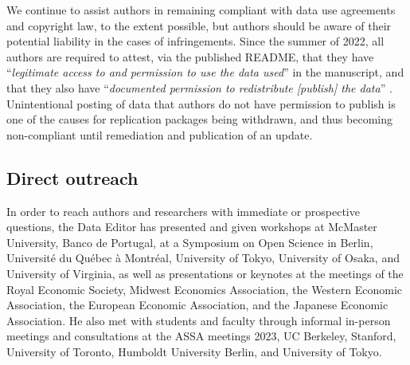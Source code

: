 We continue to assist authors in remaining compliant with data use agreements and copyright law, to the extent possible, but authors should be aware of their potential liability in the cases of infringements. Since the summer of 2022, all authors are required to attest, via the published README, that they have ``\textit{legitimate access to and permission to use the data used}'' in the manuscript, and that they also have ``\textit{documented permission to redistribute [publish] the data}'' \citep[][pg.1]{READMEv1.1.0}. Unintentional posting of data that authors do not have permission to publish is one of the causes for replication packages being withdrawn, and thus becoming non-compliant until remediation and publication of an update.

\subsection{Direct outreach}

In order to reach authors and researchers with immediate or prospective questions, the Data Editor has presented and given workshops at McMaster University, Banco de Portugal, at  a Symposium on Open Science in Berlin, Université du Québec à Montréal, University of Tokyo, University of Osaka, and University of Virginia, as well as presentations or keynotes at the meetings of the Royal Economic Society, Midwest Economics Association, the Western Economic Association, the European Economic Association, and the Japanese Economic Association.
%
He also met with students and faculty  through informal in-person meetings and consultations at the ASSA meetings 2023, UC Berkeley, Stanford, University of Toronto, Humboldt University Berlin, and University of Tokyo.